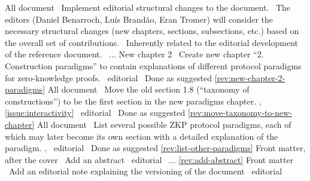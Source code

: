All document
\newcol \propContrib\ Implement editorial structural changes to the document. 
				\contributors\ The editors (Daniel Benarroch, Luís Brandão, Eran Tromer) will consider the necessary structural changes (new chapters, sections, subsections, etc.) based on the overall set of contributions.
\newcol {}
\newcol \ccontext\ Inherently related to the editorial development of the reference document.  %
				\Chan\ ...
\newcol %
\rowendL
New chapter 2
\newcol \propContrib\ 
		Create new chapter ``2. Construction paradigms'' to contain explanations 
	of different protocol paradigms for zero-knowledge proofs. 
\newcol {}
\newcol \ccontext\ editorial  
				\Chan\ Done as suggested
\newcol \ref{rev:new-chapter-2-paradigms}
\rowendL
All document
\newcol \propContrib\ Move the old section 1.8 (``taxonomy of constructions'') 
	to be the first section in the new paradigms chapter.
\newcol {}, \ref{issue:interactivity}
\newcol \ccontext\ editorial  
				\Chan\ Done as suggested
\newcol \ref{rev:move-taxonomy-to-new-chapter}
\rowendL
All document
\newcol \propContrib\ 
	List several possible ZKP protocol paradigms, each of which may later 
	become its own section with a detailed explanation of the paradigm.
\newcol \githubissue{16}, \githubissue{17}
\newcol \ccontext\ editorial  
				\Chan\ Done as suggested
\newcol \ref{rev:list-other-paradigms}
\rowendL
Front matter, after the cover
\newcol \propContrib\ Add an abstract
\newcol \githubissue{16}
\newcol \ccontext\ editorial  %
				\Chan\ ...
\newcol \ref{rev:add-abstract}
\rowendL
Front matter
\newcol \propContrib\ Add an editorial note explaining the versioning of the document
\newcol \githubissue{16}
\newcol \ccontext\ editorial  %
